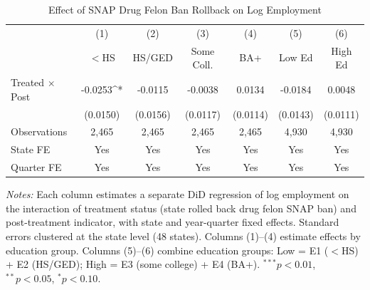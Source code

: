 \begin{table}[htbp]
\centering
\caption{Effect of SNAP Drug Felon Ban Rollback on Log Employment}
\label{tab:main}
\begin{tabular}{lcccccc}
\toprule
 & (1) & (2) & (3) & (4) & (5) & (6) \\
 & $<$HS & HS/GED & Some Coll. & BA+ & Low Ed & High Ed \\
\midrule
Treated $\times$ Post & -0.0253^{*} & -0.0115 & -0.0038 & 0.0134 & -0.0184 & 0.0048 \\
 & (0.0150) & (0.0156) & (0.0117) & (0.0114) & (0.0143) & (0.0111) \\
\midrule
Observations & 2,465 & 2,465 & 2,465 & 2,465 & 4,930 & 4,930 \\
State FE & Yes & Yes & Yes & Yes & Yes & Yes \\
Quarter FE & Yes & Yes & Yes & Yes & Yes & Yes \\
\bottomrule
\end{tabular}
\par\vspace{0.3em}
{\footnotesize \textit{Notes:} Each column estimates a separate DiD regression of log employment on the interaction of treatment status (state rolled back drug felon SNAP ban) and post-treatment indicator, with state and year-quarter fixed effects. Standard errors clustered at the state level (48 states). Columns (1)--(4) estimate effects by education group. Columns (5)--(6) combine education groups: Low = E1 ($<$HS) + E2 (HS/GED); High = E3 (some college) + E4 (BA+). $^{***}p<0.01$, $^{**}p<0.05$, $^{*}p<0.10$.}
\end{table}
